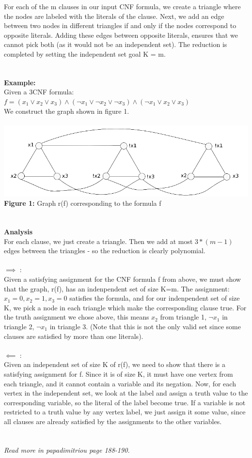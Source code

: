 \documentclass{article}
\begin{document}
For each of the m clauses in our input CNF formula, we create a triangle where the nodes are labeled with the literals of the clause. Next, we add an edge between two nodes in different triangles if and only if the nodes correspond to opposite literals. Adding these edges between opposite literals, ensures that we cannot pick both (as it would not be an independent set). The reduction is completed by setting the independent set goal K = m. \\\\\\
\textbf{Example:}\\
Given a 3CNF formula:  $f =  (x_1 \lor x_2 \lor x_3) \land (\lnot x_1 \lor \lnot x_2 \lor \lnot x_3) \land (\lnot x_1 \lor x_2 \lor x_3)$\\
We construct the graph shown in figure 1. \\\\
\includegraphics[scale=0.5]{independentset}
\textbf{Figure 1:} Graph r(f) corresponding to the formula f\\\\\\
\textbf{Analysis}\\
For each clause, we just create a triangle. Then we add at most $3 * (m-1)$ edges between the triangles - so the reduction is clearly polynomial.
\\\\
$\implies$ :\\ Given a satisfying assignment for the CNF formula f from above, we must show that the graph, r(f), has an indenpendent set of size K=m. The assignment: $x_1 = 0, x_2 = 1, x_3 = 0$ satisfies the formula, and for our indenpendent set of size K, we pick a node in each triangle which make the corresponding clause true. For the truth assignment we chose above, this means $x_2$ from triangle 1, $\lnot x_1$ in triangle 2, $\lnot x_1$ in triangle 3. (Note that this is not the only valid set since some clauses are satisfied by more than one literals).
\\\\
$\impliedby$ :\\ Given an independent set of size K of r(f), we need to show that there is a satisfying assignment for f. Since it is of size K, it must have one vertex from each triangle, and it cannot contain a variable and its negation. Now, for each vertex in the independent set, we look at the label and assign a truth value to the corresponding variable, so the literal of the label become true. If a variable is not restricted to a truth value by any vertex label, we just assign it some value, since all clauses are already satisfied by the assignments to the other variables.\\\\\\
\textit{Read more in papadimitriou page 188-190.}
\newpage
\end{document}
